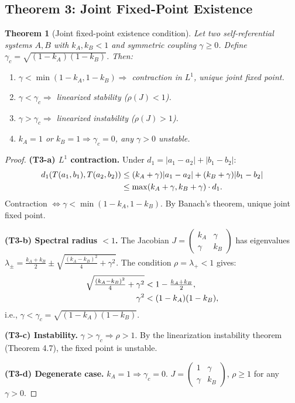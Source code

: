 \documentclass[12pt,a4paper]{article}
\newtheorem{theorem}{Theorem}[section]
\theoremstyle{definition}
\newcommand{\gamc}{\gamma_c}
\begin{document}
\subsection{Theorem 3: Joint Fixed-Point Existence}

\begin{theorem}[Joint fixed-point existence condition]
\label{thm:t3}
Let two self-referential systems $A, B$ with $k_A, k_B < 1$ and symmetric coupling $\gamma \geq 0$. Define $\gamc = \sqrt{(1-k_A)(1-k_B)}$. Then:
\begin{enumerate}[label=(T3-\alph*)]
\item $\gamma < \min(1-k_A, 1-k_B) \Rightarrow$ contraction in $L^1$, unique joint fixed point.
\item $\gamma < \gamc \Rightarrow$ linearized stability ($\rho(J) < 1$).
\item $\gamma > \gamc \Rightarrow$ linearized instability ($\rho(J) > 1$).
\item $k_A = 1$ or $k_B = 1 \Rightarrow \gamc = 0$, any $\gamma > 0$ unstable.
\end{enumerate}
\end{theorem}

\begin{proof}
\textbf{(T3-a) $L^1$ contraction.}
Under $d_1 = |a_1-a_2| + |b_1-b_2|$:
\begin{align}
d_1(T(a_1,b_1), T(a_2,b_2)) &\leq (k_A + \gamma)|a_1-a_2| + (k_B + \gamma)|b_1-b_2| \notag \\
&\leq \max(k_A+\gamma, k_B+\gamma) \cdot d_1. \notag
\end{align}
Contraction $\iff \gamma < \min(1-k_A, 1-k_B)$. By Banach's theorem, unique joint fixed point.

\textbf{(T3-b) Spectral radius $< 1$.}
The Jacobian $J = \begin{pmatrix} k_A & \gamma \\ \gamma & k_B \end{pmatrix}$ has eigenvalues $\lambda_\pm = \frac{k_A+k_B}{2} \pm \sqrt{\frac{(k_A-k_B)^2}{4} + \gamma^2}$. The condition $\rho = \lambda_+ < 1$ gives:
\begin{align}
\sqrt{\tfrac{(k_A-k_B)^2}{4} + \gamma^2} &< 1 - \tfrac{k_A+k_B}{2}, \notag \\
\gamma^2 &< (1-k_A)(1-k_B), \notag
\end{align}
i.e., $\gamma < \gamc = \sqrt{(1-k_A)(1-k_B)}$.

\textbf{(T3-c) Instability.}
$\gamma > \gamc \Rightarrow \rho > 1$. By the linearization instability theorem~\cite{Khalil2002} (Theorem 4.7), the fixed point is unstable.

\textbf{(T3-d) Degenerate case.}
$k_A = 1 \Rightarrow \gamc = 0$. $J = \begin{pmatrix} 1 & \gamma \\ \gamma & k_B \end{pmatrix}$, $\rho \geq 1$ for any $\gamma > 0$.
\end{proof}
\end{document}

